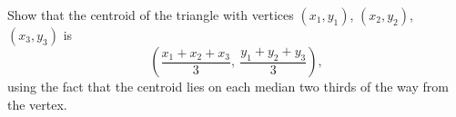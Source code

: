 Show that the centroid of the triangle with vertices $(x_1,y_1)$, $(x_2,y_2)$, $(x_3,y_3)$ is
\[
\left(\dfrac{x_1+x_2+x_3}{3},\ \dfrac{y_1+y_2+y_3}{3}\right),
\]
using the fact that the centroid lies on each median two thirds of the way from the vertex.
